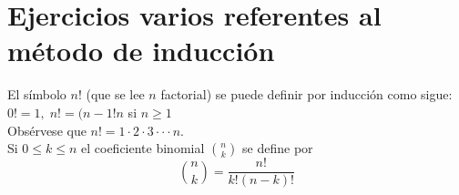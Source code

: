 \section{Ejercicios varios referentes al método de inducción}
\begin{tcolorbox}[colback=white]
\begin{def.}
El símbolo $n!$ (que se lee $n$ factorial) se puede definir por inducción como sigue: $0!=1, \; n!=(n-1!n$ si $n\geq 1$\\
Obsérvese que $n!=1\cdot 2 \cdot 3 \cdot \cdot \cdot n.$\\
Si $0\leq k \leq n$ el coeficiente binomial ${n \choose k}$ se define por 
$${n \choose k} = \dfrac{n!}{k!(n-k)!}$$
\end{def.}
\end{tcolorbox}
